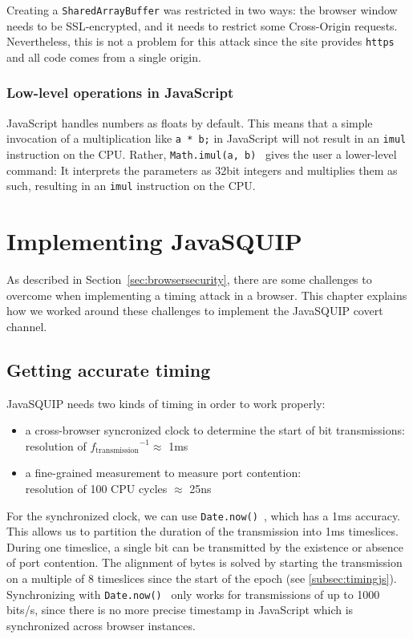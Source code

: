 \documentclass[11pt,
  titlepage=false,
]{scrreprt}
\begin{document}
Creating a \texttt{SharedArrayBuffer} was restricted in two ways: the browser window needs to be SSL-encrypted, and it needs to restrict some Cross-Origin requests.
Nevertheless, this is not a problem for this attack since the site provides \texttt{https} and all code comes from a single origin.


\subsection{Low-level operations in JavaScript}\label{subsec:lowleveljs}
JavaScript handles numbers as floats by default.
This means that a simple invocation of a multiplication like \texttt{a * b;} in JavaScript will not result in an \texttt{imul} instruction on the CPU.
Rather, \texttt{Math.imul(a, b)}~\cite{mathimul} gives the user a lower-level command:
It interprets the parameters as 32bit integers and multiplies them as such, resulting in an \texttt{imul} instruction on the CPU.


\chapter{Implementing JavaSQUIP}
\label{ch:implementation}
As described in Section~\ref{sec:browsersecurity}, there are some challenges to overcome when implementing a timing attack in a browser.
This chapter explains how we worked around these challenges to implement the JavaSQUIP covert channel.

\section{Getting accurate timing}
\label{sec:accurate-timing}
JavaSQUIP needs two kinds of timing in order to work properly:
\begin{itemize}
    \item a cross-browser syncronized clock to determine the start of bit transmissions:\\
    resolution of ${f_{\text{transmission}}}^{-1} \approx$ 1ms
    \item a fine-grained measurement to measure port contention:\\
    resolution of 100 CPU cycles $\approx$ 25ns
\end{itemize}

For the synchronized clock, we can use \texttt{Date.now()}~\cite{datenow}, which has a 1ms accuracy.
This allows us to partition the duration of the transmission into 1ms timeslices.
During one timeslice, a single bit can be transmitted by the existence or absence of port contention.
The alignment of bytes is solved by starting the transmission on a multiple of 8 timeslices since the start of the epoch (see \ref{subsec:timingjs}).
Synchronizing with \texttt{Date.now()}~\cite{datenow} only works for transmissions of up to 1000 bits/s,
since there is no more precise timestamp in JavaScript which is synchronized across browser instances.
\end{document}
